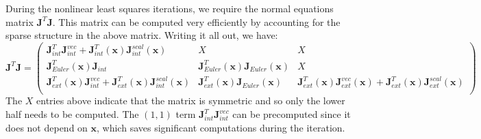 \documentclass{article}
\begin{document}
During the nonlinear least squares iterations, we require the normal equations matrix
$\mathbf{J}^T \mathbf{J}$. This matrix can be computed very efficiently by accounting
for the sparse structure in the above matrix. Writing it all out, we have:
\begin{equation}
\mathbf{J}^T \mathbf{J} =
\left(
\begin{array}{ccc}
\mathbf{J}_{int}^T \mathbf{J}_{int}^{vec} + \mathbf{J}_{int}^T(\mathbf{x}) \mathbf{J}_{int}^{scal}(\mathbf{x}) & X & X \\
\mathbf{J}_{Euler}^T(\mathbf{x}) \mathbf{J}_{int} & \mathbf{J}_{Euler}^T(\mathbf{x}) \mathbf{J}_{Euler}(\mathbf{x}) & X \\
\mathbf{J}_{ext}^T(\mathbf{x}) \mathbf{J}_{int}^{vec} + \mathbf{J}_{ext}^T(\mathbf{x}) \mathbf{J}_{int}^{scal}(\mathbf{x})  & \mathbf{J}_{ext}^T(\mathbf{x}) \mathbf{J}_{Euler}(\mathbf{x}) & \mathbf{J}_{ext}^T(\mathbf{x}) \mathbf{J}_{ext}^{vec}(\mathbf{x}) + \mathbf{J}_{ext}^T(\mathbf{x}) \mathbf{J}_{ext}^{scal}(\mathbf{x}) \\
\end{array}
\right)
\end{equation}
The $X$ entries above indicate that the matrix is symmetric and so only the lower half needs to
be computed. The $(1,1)$ term $\mathbf{J}_{int}^T \mathbf{J}_{int}^{vec}$ can be precomputed
since it does not depend on $\mathbf{x}$, which saves significant computations during the
iteration.
\end{document}
